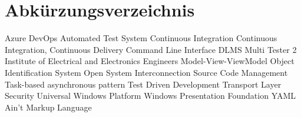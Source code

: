 \renewcommand{\chaptermark}[1]{\markboth{\spacedlowsmallcaps{#1}}{\spacedlowsmallcaps{#1}}}
\renewcommand{\sectionmark}[1]{\markright{\thesection\enspace\spacedlowsmallcaps{#1}}}
\chapter*{Abk\"{u}rzungsverzeichnis}

\begin{acronym}[UML]
      {Azure DevOps}
      {Automated Test System}
   {Continuous Integration}
   {Continuous Integration, Continuous Delivery}
   {Command Line Interface}
   {DLMS Multi Tester 2}
   {Institute of Electrical and Electronics Engineers}
   {Model-View-ViewModel}
   {Object Identification System}
   {Open System Interconnection}
   {Source Code Management}
   {Task-based asynchronous pattern}
   {Test Driven Development}
   {Transport Layer Security}
   {Universal Windows Platform}
   {Windows Presentation Foundation}
   {YAML Ain't Markup Language}

\end{acronym}

\cleardoublepage
